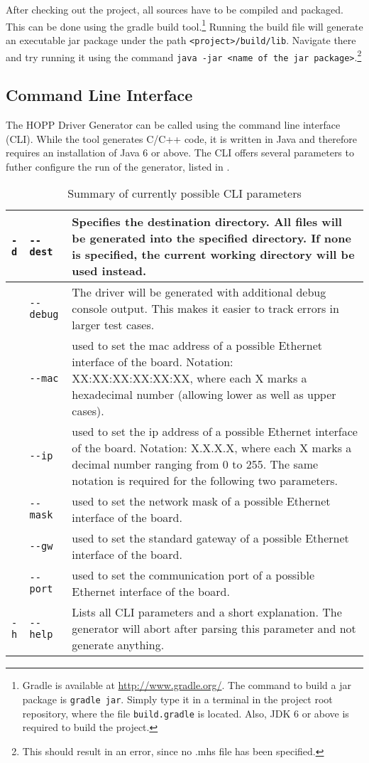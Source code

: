 \documentclass{report}
\begin{document}
After checking out the project, all sources have to be compiled and packaged. This can be done using the gradle build tool.\footnote{Gradle is available at \url{http://www.gradle.org/}. The command to build a jar package is \texttt{gradle jar}. Simply type it in a terminal in the project root repository, where the file \texttt{build.gradle} is located. Also, JDK 6 or above is required to build the project.} Running the build file will generate an executable jar package under the path \texttt{<project>/build/lib}. Navigate there and try running it using the command \texttt{java -jar <name of the jar package>}.\footnote{This should result in an error, since no .mhs file has been specified.} 

\subsection{Command Line Interface}
The HOPP Driver Generator can be called using the command line interface (CLI). While the tool generates C/C++ code, it is written in Java and therefore requires an installation of Java 6 or above. The CLI offers several parameters to futher configure the run of the generator, listed in .

\begin{table}
\centering
\begin{tabular}{ ll | p{9cm} } 
\hline
\verb!-d! & \verb!--dest! & Specifies the destination directory. All files will be generated into the specified directory. If none is specified, the current working directory will be used instead.\\ \hline
& \verb!--debug! & The driver will be generated with additional debug console output. This makes it easier to track errors in larger test cases.\\ \hline
& \verb!--mac! & used to set the mac address of a possible Ethernet interface of the board. Notation: XX:XX:XX:XX:XX:XX, where each X marks a hexadecimal number (allowing lower as well as upper cases).\\
& \verb!--ip! & used to set the ip address of a possible Ethernet interface of the board. Notation: X.X.X.X, where each X marks a decimal number ranging from 0 to 255. The same notation is required for the following two parameters.\\
& \verb!--mask! & used to set the network mask of a possible Ethernet interface of the board.\\
& \verb!--gw! & used to set the standard gateway of a possible Ethernet interface of the board.\\
& \verb!--port! & used to set the communication port of a possible Ethernet interface of the board. \color{red}{Note that these five parameters are only contemporary and will be replaced by the new board description language (I hope).}\\ \hline
\verb!-h! & \verb!--help! & Lists all CLI parameters and a short explanation. The generator will abort after parsing this parameter and not generate anything.\\ \hline
\end{tabular}
\caption{Summary of currently possible CLI parameters}
\label{tab:cliParams}
\end{table}
\end{document}
